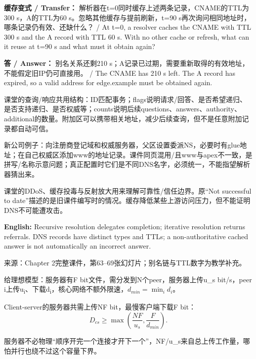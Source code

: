 \textbf{缓存变式 / Transfer：} 解析器在t=0同时缓存上述两条记录，CNAME的TTL为300 s，A的TTL为60 s。忽略其他缓存与提前刷新，t=90 s再次询问相同地址时，哪条记录仍有效、还缺什么？ / At t=0, a resolver caches the CNAME with TTL 300 s and the A record with TTL 60 s. With no other cache or refresh, what can it reuse at t=90 s and what must it obtain again?


\textbf{答 / Answer：} 别名关系还剩210 s；A记录已过期，需要重新取得的有效地址，不能假定旧IP仍可直接用。 / The CNAME has 210 s left. The A record has expired, so a valid address for edge.example must be obtained again.


课堂的查询/响应共用结构：ID匹配事务；flags说明请求/回答、是否希望递归、是否支持递归、是否权威等；counts说明后续questions、answers、authority、additional的数量。附加区可以携带相关地址，减少后续查询，但不是任意附加记录都自动可信。


新公司例子：向注册商登记域和权威服务器，父区设置委派NS，必要时有glue地址；在自己权威区添加www的地址记录。课件同页混用/且www与apex不一致，是拼写/名称示意问题；真正配置时它们是不同DNS名字，必须统一，不能指望解析器猜出来。


课堂的DDoS、缓存投毒与反射放大用来理解可靠性/信任边界。原“Not successful to date”描述的是旧课件编写时的情况。缓存降低某些上游访问压力，但不能证明DNS不可能遭攻击。


\textbf{English:} Recursive resolution delegates completion; iterative resolution returns referrals. DNS records have distinct types and TTLs; a non-authoritative cached answer is not automatically an incorrect answer.


来源：Chapter 2完整课件，第63–69张幻灯片；别名链与TTL数字为教学补充。








给理想模型：服务器有F bit文件，需分发到N个peer，服务器上传u\_s bit/s，peer i上传u\textsubscript{i}、下载d\textsubscript{i}，核心网络不额外限速，\(d_{min}=\min_i d_i\)。


Client-server的服务器共需上传NF bit，最慢客户端下载F bit：
\[
D_{cs}\ge\max\left(\frac{NF}{u_s},\frac F{d_{min}}\right).\tag{2.1}
\]


服务器不必物理“顺序开完一个连接才开下一个”，NF/u\_s来自总上传工作量，哪怕并行也绕不过这个容量下界。


